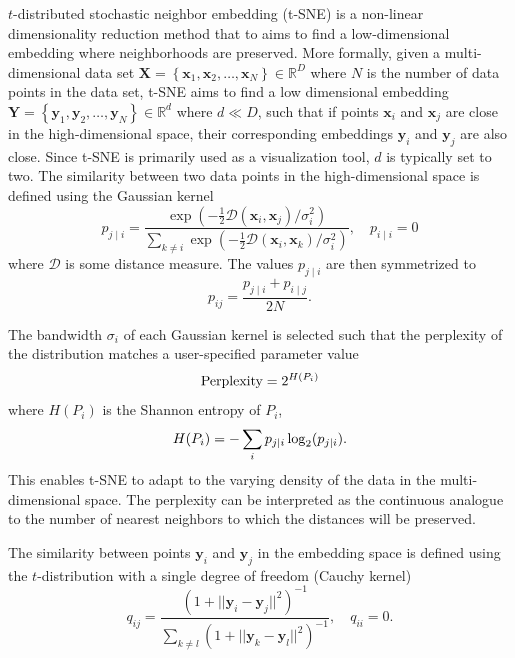 \documentclass[article]{jss}
\begin{document}
$t$-distributed stochastic neighbor embedding (t-SNE) is a non-linear
dimensionality reduction method that to aims to find a low-dimensional embedding
where neighborhoods are preserved. More formally, given a multi-dimensional data set
$\mathbf{X} = \left \{ \mathbf{x}_1, \mathbf{x}_2, \dots, \mathbf{x}_N \right \}
\in \mathbb{R}^D$ where $N$ is the number of data points in the data set, t-SNE
aims to find a low dimensional embedding $\mathbf{Y} = \left \{ \mathbf{y}_1,
\mathbf{y}_2, \dots, \mathbf{y}_N \right\} \in \mathbb{R}^d$ where $d \ll D$,
such that if points $\mathbf{x}_i$ and $\mathbf{x}_j$ are close in the
high-dimensional space, their corresponding embeddings $\mathbf{y}_i$ and
$\mathbf{y}_j$ are also close. Since t-SNE is primarily used as a visualization
tool, $d$ is typically set to two. The similarity between two data points in the
high-dimensional space is defined using the Gaussian kernel
\begin{equation}
p_{j \mid i} = \frac{\exp \left ( -\frac{1}{2} \mathcal{D}(\mathbf{x}_i, \mathbf{x}_j ) / \sigma_i^2 \right )}
{\sum_{k \neq i } \exp \left ( -\frac{1}{2} \mathcal{D}(\mathbf{x}_i, \mathbf{x}_k ) / \sigma_i^2 \right )}, \quad p_{i \mid i} = 0
\label{eq:p_ij}
\end{equation}
where $\mathcal{D}$ is some distance measure. The values $p_{j \mid i}$
are then symmetrized to
\begin{equation}
p_{ij} = \frac{p_{j \mid i} + p_{i \mid j}}{2N}.
\label{eq:symmetrize}
\end{equation}

The bandwidth $\sigma_i$ of each Gaussian kernel is selected such that the perplexity of the distribution matches a user-specified parameter value
\begin{equation}
\text{Perplexity} = 2^{H(P_i)} \notag
\end{equation}
where $H(P_i)$ is the Shannon entropy of $P_i$,
\begin{equation}
H(P_i) = -\sum_i p_{j \mid i} \log_2 (p_{j \mid i}). \notag
\end{equation}
This enables t-SNE to adapt to the varying density of the data in the
multi-dimensional space. The perplexity can be interpreted as the continuous
analogue to the number of nearest neighbors to which the distances will be
preserved. 

The similarity between points $\mathbf{y}_i$ and $\mathbf{y}_j$ in the embedding
space is defined using the $t$-distribution with a single degree of freedom
(Cauchy kernel)
\begin{equation}
q_{ij} = \frac{\left ( 1 + || \mathbf{y}_i - \mathbf{y}_j ||^2 \right )^{-1}}
{\sum_{k \neq l}\left ( 1 + || \mathbf{y}_k - \mathbf{y}_l ||^2 \right )^{-1}},
\quad q_{ii} = 0.
\label{eq:cauchy_kernel}
\end{equation}
\end{document}
